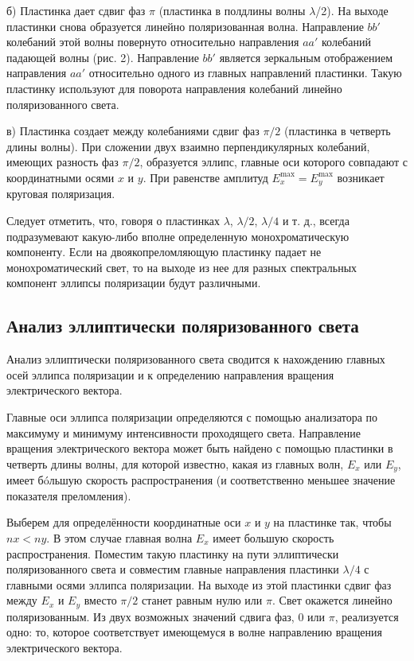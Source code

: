 \documentclass[a4paper,12pt]{article} %
\begin{document}
\hfill \break б) Пластинка дает сдвиг фаз $\pi$ (пластинка в полдлины волны $\lambda$/2). На выходе пластинки снова образуется линейно поляризованная волна. Направление $bb'$ колебаний этой волны повернуто относительно направления $aa'$ колебаний падающей волны (рис. 2). Направление $bb'$ является зеркальным отображением направления $aa'$ относительно одного из главных направлений пластинки. Такую пластинку используют для поворота направления колебаний линейно поляризованного света.

\hfill \break в) Пластинка создает между колебаниями сдвиг фаз $\pi/2$ (пластинка в четверть длины волны). При сложении двух взаимно перпендикулярных колебаний, имеющих разность фаз $\pi/2$, образуется эллипс, главные оси которого совпадают с координатными осями $x$ и $y$. При равенстве амплитуд $E_{x}^{\text{max}} = E_{y}^{\text{max}}$ возникает круговая поляризация.

\hfill \break Следует отметить, что, говоря о пластинках $\lambda$, $\lambda/2$, $\lambda/4$ и т. д., всегда подразумевают какую-либо вполне определенную монохроматическую компоненту. Если на двоякопреломляющую пластинку падает не монохроматический свет, то на выходе из нее для разных спектральных компонент эллипсы поляризации будут различными.

\subsection{Анализ эллиптически поляризованного света}

\hfill \break Анализ эллиптически поляризованного света сводится к нахождению главных осей эллипса поляризации и к определению направления вращения электрического вектора.

\hfill \break Главные оси эллипса поляризации определяются с помощью анализатора по максимуму и минимуму интенсивности проходящего света. Направление вращения электрического вектора может быть найдено с помощью пластинки в четверть длины волны, для которой известно, какая из главных волн, $ E_x $ или $ E_y $, имеет б\'{o}льшую скорость распространения (и соответственно меньшее значение показателя преломления).

\hfill \break Выберем для определённости координатные оси $x$ и $y$ на пластинке так, чтобы $ nx < ny $. В этом случае главная волна $ E_x $ имеет большую скорость распространения. Поместим такую пластинку на пути эллиптически поляризованного света и совместим главные направления пластинки $ \lambda/4 $ с главными осями эллипса поляризации. На выходе из этой пластинки сдвиг фаз между $ E_x $ и $ E_y $ вместо $ \pi/2 $ станет равным нулю или $ \pi $. Свет окажется линейно поляризованным. Из двух возможных значений сдвига фаз, $0$ или $ \pi $, реализуется одно: то, которое соответствует имеющемуся в волне направлению вращения электрического вектора.
\end{document}
